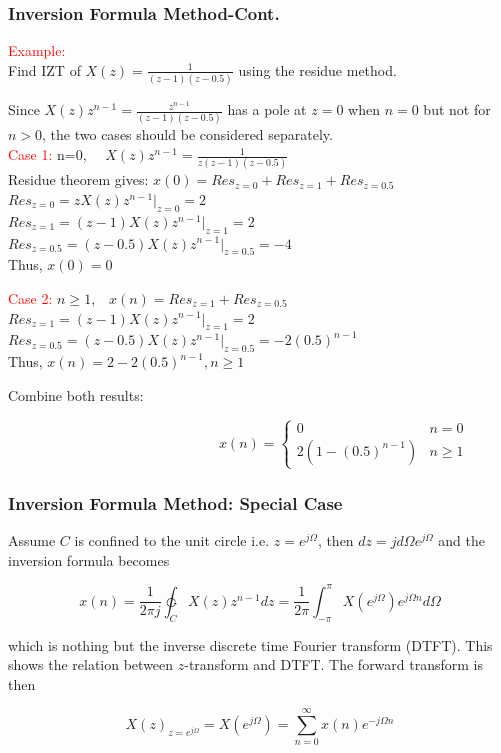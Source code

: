\documentclass[mathserif, 10pt]{beamer} %
\begin{document}
\frame
{
\frametitle {Inversion Formula Method-Cont.}

\textcolor{red}{Example: } \\ %

Find IZT of $X(z) = \frac{1}{(z-1)(z-0.5)}$ using the residue method. \\ %


\vspace{.05in}

Since $X(z) z^{n-1} = \frac{z^{n-1}}{(z-1)(z-0.5)}$ has a pole at $z=0$ when $n=0$ but not for $n> 0$, the two cases should be considered separately.\\
\textcolor{red}{Case 1:}  n=0, ~~$X(z)z^{n-1} = \frac{1}{z(z-1)(z-0.5)}$\\
Residue theorem gives: $x(0)=Res_{z=0}+Res_{z=1}+Res_{z=0.5}$\\
$Res_{z=0} = zX(z)z^{n-1}|_{z=0}=2$\\
$Res_{z=1} = (z-1)X(z)z^{n-1}|_{z=1}=2$\\
$Res_{z=0.5} = (z-0.5)X(z)z^{n-1}|_{z=0.5}=-4$\\
Thus, $x(0)=0$

\textcolor{red}{Case 2:}  $n\ge 1$,~~$x(n) = Res_{z=1}+Res_{z=0.5}$\\
$Res_{z=1} = (z-1)X(z)z^{n-1}|_{z=1}=2$\\
$Res_{z=0.5} = (z-0.5)X(z)z^{n-1}|_{z=0.5}=-2(0.5)^{n-1}$\\
Thus, $x(n) = 2-2(0.5)^{n-1}, n \ge 1$\\ \vspace{.1in}

Combine both results:

\vspace{-.5in}

\begin{displaymath}
\hspace{2in}
   x(n) = \left\{
    \begin{array}{lr}
       0 &  n=0\\
       2(1-(0.5)^{n-1}) &  n \ge 1
    \end{array}
   \right.
\end{displaymath}

}

\frame
{

\frametitle{Inversion Formula Method: Special Case}
\normalsize

Assume $C$ is confined to the unit circle i.e. $z=e^{j\Omega}$, then $dz=j d \Omega e^{j\Omega}$ and the
inversion formula becomes

\[x(n) = \frac{1}{2 \pi j}  \ointctrclockwise_C X(z) z^{n-1} dz = \frac{1}{2 \pi} \int^\pi_{-\pi} X(e^{j\Omega}) e^{j\Omega n} d\Omega \]

which is nothing but the inverse discrete time Fourier transform (DTFT).  This shows the relation between $z$-transform
and DTFT.  The forward transform is then

\[X(z)_{z=e^{j\Omega}} = X(e^{j\Omega})= \sum\limits_{n=0}^{\infty} x(n) e^{-j\Omega n} \]


}
\end{document}
